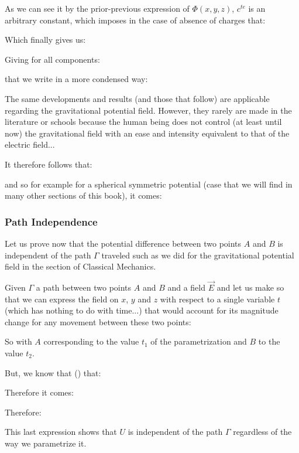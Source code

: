 	As we can see it by the prior-previous expression of $\Phi(x,y,z)$, $c^{te}$ is an arbitrary constant, which imposes in the case of absence of charges that:
	
	Which finally gives us:
	
	Giving for all components:
	
	that we write in a more condensed way\label{derivation of electric field by the potential}:
	
	\begin{tcolorbox}[title=Remark,colframe=black,arc=10pt]
	The same developments and results (and those that follow) are applicable regarding the gravitational potential field. However, they rarely are made in the literature or schools because the human being does not control (at least until now) the gravitational field with an ease and intensity equivalent to that of the electric field...
	\end{tcolorbox}
	It therefore follows that:
	
	and so for example for a spherical symmetric potential (case that we will find in many other sections of this book), it comes:
	
	
	\pagebreak
	\subsubsection{Path Independence}
	Let us prove now that the potential difference between two points $A$ and $B$ is independent of the path $\Gamma$ traveled such as we did for the gravitational potential field in the section of Classical Mechanics.

	Given $\Gamma$ a path between two points $A$ and $B$ and a field $\vec{E}$ and let us make so that we can express the field on $x$, $y$ and $z$ with respect to a single variable $t$ (which has nothing to do with time...) that would account for its magnitude change for  any movement between these two points:
	
	So with $A$ corresponding to the value $t_1$ of the parametrization and $B$ to the value $t_2$. 
	
	But, we know that () that:
	
	Therefore it comes:
	
	Therefore:
	
	This last expression shows that $U$ is independent of the path $\Gamma$ regardless of the way we parametrize it.
	
